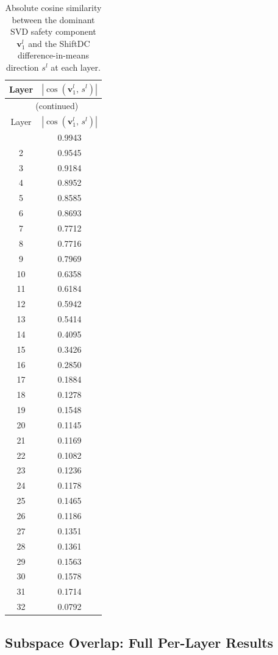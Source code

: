 \documentclass{article}
\begin{document}
\begin{longtable}{cc}
\caption{Absolute cosine similarity between the dominant SVD safety component
         $\mathbf{v}_1^l$ and the ShiftDC difference-in-means direction $s^l$
         at each layer.}
\label{tab:dom_cosine_full}\\
\toprule
Layer & $|\cos(\mathbf{v}_1^l,\, s^l)|$ \\
\midrule
\endfirsthead
\multicolumn{2}{c}{\tablename\ \thetable{} (continued)} \\
\toprule
Layer & $|\cos(\mathbf{v}_1^l,\, s^l)|$ \\
\midrule
\endhead
\bottomrule
\endlastfoot
 1 & 0.9943 \\ 2 & 0.9545 \\ 3 & 0.9184 \\ 4 & 0.8952 \\
 5 & 0.8585 \\ 6 & 0.8693 \\ 7 & 0.7712 \\ 8 & 0.7716 \\
 9 & 0.7969 \\ 10 & 0.6358 \\ 11 & 0.6184 \\ 12 & 0.5942 \\
13 & 0.5414 \\ 14 & 0.4095 \\ 15 & 0.3426 \\ 16 & 0.2850 \\
17 & 0.1884 \\ 18 & 0.1278 \\ 19 & 0.1548 \\ 20 & 0.1145 \\
21 & 0.1169 \\ 22 & 0.1082 \\ 23 & 0.1236 \\ 24 & 0.1178 \\
25 & 0.1465 \\ 26 & 0.1186 \\ 27 & 0.1351 \\ 28 & 0.1361 \\
29 & 0.1563 \\ 30 & 0.1578 \\ 31 & 0.1714 \\ 32 & 0.0792 \\
\end{longtable}

\subsection{Subspace Overlap: Full Per-Layer Results}
\label{app:overlap_full}
\end{document}
